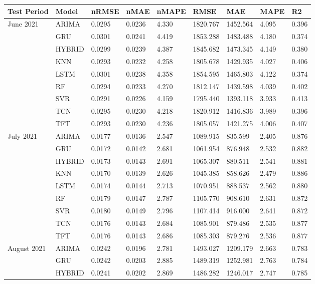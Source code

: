 \begin{tabular}{lllllllll}
\toprule
Test Period & Model & nRMSE & nMAE & nMAPE & RMSE & MAE & MAPE & R2 \\
\midrule
June 2021 & ARIMA & 0.0295 & 0.0236 & 4.330 & 1820.767 & 1452.564 & 4.095 & 0.396 \\
 & GRU & 0.0301 & 0.0241 & 4.419 & 1853.288 & 1483.488 & 4.180 & 0.374 \\
 & HYBRID & 0.0299 & 0.0239 & 4.387 & 1845.682 & 1473.345 & 4.149 & 0.380 \\
 & KNN & 0.0293 & 0.0232 & 4.258 & 1805.678 & 1429.935 & 4.027 & 0.406 \\
 & LSTM & 0.0301 & 0.0238 & 4.358 & 1854.595 & 1465.803 & 4.122 & 0.374 \\
 & RF & 0.0294 & 0.0233 & 4.270 & 1812.147 & 1439.598 & 4.039 & 0.402 \\
 & SVR & 0.0291 & 0.0226 & 4.159 & 1795.440 & 1393.118 & 3.933 & 0.413 \\
 & TCN & 0.0295 & 0.0230 & 4.218 & 1820.912 & 1416.836 & 3.989 & 0.396 \\
 & TFT & 0.0293 & 0.0230 & 4.236 & 1805.057 & 1421.275 & 4.006 & 0.407 \\
July 2021 & ARIMA & 0.0177 & 0.0136 & 2.547 & 1089.915 & 835.599 & 2.405 & 0.876 \\
 & GRU & 0.0172 & 0.0142 & 2.681 & 1061.954 & 876.948 & 2.532 & 0.882 \\
 & HYBRID & 0.0173 & 0.0143 & 2.691 & 1065.307 & 880.511 & 2.541 & 0.881 \\
 & KNN & 0.0170 & 0.0139 & 2.626 & 1045.385 & 858.626 & 2.479 & 0.886 \\
 & LSTM & 0.0174 & 0.0144 & 2.713 & 1070.951 & 888.537 & 2.562 & 0.880 \\
 & RF & 0.0179 & 0.0147 & 2.787 & 1105.770 & 908.610 & 2.631 & 0.872 \\
 & SVR & 0.0180 & 0.0149 & 2.796 & 1107.414 & 916.000 & 2.641 & 0.872 \\
 & TCN & 0.0176 & 0.0143 & 2.684 & 1085.901 & 879.486 & 2.535 & 0.877 \\
 & TFT & 0.0176 & 0.0143 & 2.686 & 1085.303 & 879.276 & 2.536 & 0.877 \\
August 2021 & ARIMA & 0.0242 & 0.0196 & 2.781 & 1493.027 & 1209.179 & 2.663 & 0.783 \\
 & GRU & 0.0242 & 0.0203 & 2.885 & 1489.319 & 1252.981 & 2.763 & 0.784 \\
 & HYBRID & 0.0241 & 0.0202 & 2.869 & 1486.282 & 1246.017 & 2.747 & 0.785 \\

\end{tabular}
